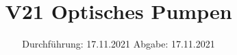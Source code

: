 

\subject{Fortgeschrittenenpraktikum}
\title{V21 Optisches Pumpen}
\date{%
  Durchführung: 17.11.2021
  \hspace{3em}
  Abgabe: 17.11.2021
}



\maketitle
\thispagestyle{empty}
\tableofcontents
\newpage








\printbibliography{}




